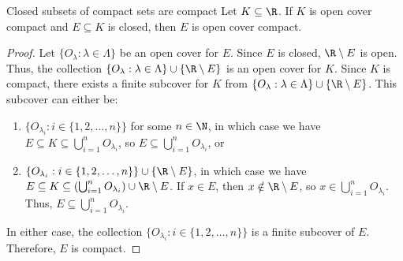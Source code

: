 \begin{thmbox}{Closed subsets of compact sets are compact}{}
    Let $K \subseteq \R$. If $K$ is open cover compact and $E \subseteq K$ is closed, then $E$ is open cover compact.
    \tcblower
    \begin{proof}
        Let $\{O_\lambda : \lambda \in \Lambda\}$ be an open cover for $E$. Since $E$ is closed, $\R \setminus E$ is open. Thus, the collection $\{ O_\lambda : \lambda \in \Lambda \} \cup \{ \R \setminus E \}$ is an open cover for $K$. Since $K$ is compact, there exists a finite subcover for $K$ from $\{ O_\lambda : \lambda \in \Lambda \} \cup \{ \R \setminus E \}$. This subcover can either be:
        \begin{enumerate}
            \item $\{O_{\lambda_i} : i \in \{1, 2, \ldots, n\}\}$ for some $n \in \N$, in which case we have $E \subseteq K \subseteq \bigcup_{i=1}^{n} O_{\lambda_i}$, so $E \subseteq \bigcup_{i=1}^{n}O_{\lambda_i}$, or
            \item $\{O_{\lambda_i} : i \in \{1,2,\ldots,n\} \} \cup \{ \R \setminus E\}$, in which case we have $E \subseteq K \subseteq \left( \bigcup_{i=1}^{n} O_{\lambda_i} \right) \cup \R \setminus E$. If $x \in E$, then $x \notin \R \setminus E$, so $x \in \bigcup_{i=1}^{n} O_{\lambda_i}$. Thus, $E \subseteq \bigcup_{i=1}^{n} O_{\lambda_i}$.
        \end{enumerate}
        In either case, the collection $\{ O_{\lambda_i} : i \in \{1,2,\ldots,n\}\}$ is a finite subcover of $E$. Therefore, $E$ is compact.
    \end{proof}
\end{thmbox}

